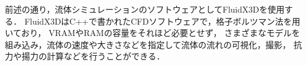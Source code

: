 
前述の通り，流体シミュレーションのソフトウェアとしてFluidX3Dを使用する．
FluidX3DはC++で書かれたCFDソフトウェアで，格子ボルツマン法を用いており，
VRAMやRAMの容量をそれほど必要とせず，
さまざまなモデルを組み込み，流体の速度や大きさなどを指定して流体の流れの可視化，撮影，
抗力や揚力の計算などを行うことができる．